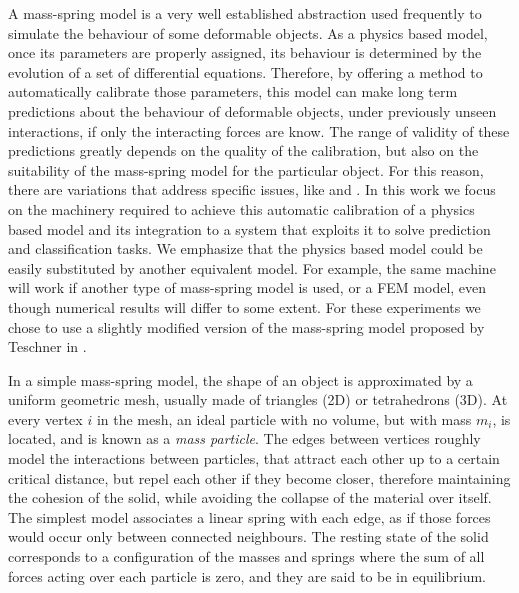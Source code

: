 \documentclass[journal]{IEEEtran}
\newcommand{\sref}[1]{Section~\ref{#1}}
\newcommand{\comment}[1]{{\color{red} #1}}
\begin{document}
\comment{
A mass-spring model is a very well established abstraction used frequently to simulate the behaviour of some deformable objects.  As a physics based model, once its parameters are properly assigned, its behaviour is determined by the evolution of a set of differential equations.  Therefore, by offering a method to automatically calibrate those parameters, this model can make long term predictions about the behaviour of deformable objects, under previously unseen interactions, if only the interacting forces are know.  The range of validity of these predictions greatly depends on the quality of the calibration, but also on the suitability of the mass-spring model for the particular object.  For this reason, there are variations that address specific issues, like \cite{Bourguignon2000} and \cite{Teschner2004}.  In this work we focus on the machinery required to achieve this automatic calibration of a physics based model and its integration to a system that exploits it to solve prediction and classification tasks.  We emphasize that the physics based model could be easily substituted by another equivalent model.  For example, the same machine will work if another type of mass-spring model is used, or a FEM model, even though numerical results will differ to some extent.  For these experiments we chose to use a slightly modified version of the mass-spring model proposed by Teschner in \cite{Teschner2004}.


In a simple mass-spring model, the shape of an object is approximated by a uniform geometric mesh, usually made of triangles (2D) or tetrahedrons (3D).  At every vertex $i$ in the mesh, an ideal particle with no volume, but with mass $m_i$, is located, and is known as a \textit{mass particle}.  The edges between vertices roughly model the interactions between particles, that attract each other up to a certain critical distance, but repel each other if they become closer, therefore maintaining the cohesion of the solid, while avoiding the collapse of the material over itself.  The simplest model associates a linear spring with each edge, as if those forces would occur only between connected neighbours.  The resting state of the solid corresponds to a configuration of the masses and springs where the sum of all forces acting over each particle is zero, and they are said to be in equilibrium.

}
\end{document}
